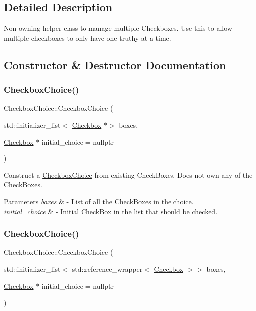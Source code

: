 \subsection{Detailed Description}
Non-\/owning helper class to manage multiple Checkboxes. Use this to allow multiple checkboxes to only have one truthy at a time. 

\subsection{Constructor \& Destructor Documentation}
\mbox{\label{class_checkbox_choice_aef739358c920959f7158498af135d261}} 
\subsubsection{\texorpdfstring{Checkbox\+Choice()}{CheckboxChoice()}\hspace{0.1cm}{\footnotesize\ttfamily [1/4]}}
{\footnotesize\ttfamily Checkbox\+Choice\+::\+Checkbox\+Choice (\begin{DoxyParamCaption}\item[{std\+::initializer\+\_\+list$<$ \mbox{\hyperlink{class_checkbox}{Checkbox}} $\ast$$>$}]{boxes,  }\item[{\mbox{\hyperlink{class_checkbox}{Checkbox}} $\ast$}]{initial\+\_\+choice = {\ttfamily nullptr} }\end{DoxyParamCaption})}

Construct a \mbox{\hyperlink{class_checkbox_choice}{Checkbox\+Choice}} from existing Check\+Boxes. Does not own any of the Check\+Boxes. 
\begin{DoxyParams}{Parameters}
{\em boxes} & -\/ List of all the Check\+Boxes in the choice. \\
\hline
{\em initial\+\_\+choice} & -\/ Initial Check\+Box in the list that should be checked. \\
\hline
\end{DoxyParams}
\mbox{\label{class_checkbox_choice_acbbc8db19fa53fc73c913780e0fb2b89}} 
\subsubsection{\texorpdfstring{Checkbox\+Choice()}{CheckboxChoice()}\hspace{0.1cm}{\footnotesize\ttfamily [2/4]}}
{\footnotesize\ttfamily Checkbox\+Choice\+::\+Checkbox\+Choice (\begin{DoxyParamCaption}\item[{std\+::initializer\+\_\+list$<$ std\+::reference\+\_\+wrapper$<$ \mbox{\hyperlink{class_checkbox}{Checkbox}} $>$$>$}]{boxes,  }\item[{\mbox{\hyperlink{class_checkbox}{Checkbox}} $\ast$}]{initial\+\_\+choice = {\ttfamily nullptr} }\end{DoxyParamCaption})}

